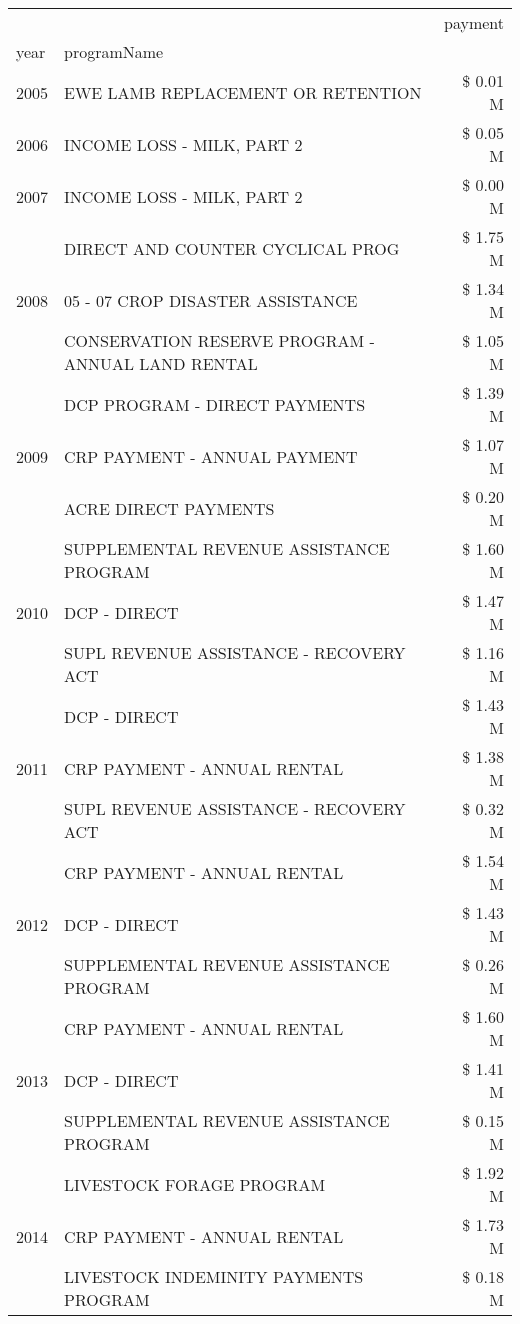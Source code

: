 \begin{tabular}{llr}
\toprule
 &  & payment \\
year & programName &  \\
\midrule
2005 & EWE LAMB REPLACEMENT OR RETENTION & \$ 0.01 M \\
\cline{1-3}
2006 & INCOME LOSS - MILK, PART 2 & \$ 0.05 M \\
\cline{1-3}
2007 & INCOME LOSS - MILK, PART 2 & \$ 0.00 M \\
\cline{1-3}
\multirow[t]{3}{*}{2008} & DIRECT AND COUNTER CYCLICAL PROG & \$ 1.75 M \\
 & 05 - 07 CROP DISASTER ASSISTANCE & \$ 1.34 M \\
 & CONSERVATION RESERVE PROGRAM - ANNUAL LAND RENTAL & \$ 1.05 M \\
\cline{1-3}
\multirow[t]{3}{*}{2009} & DCP PROGRAM - DIRECT PAYMENTS & \$ 1.39 M \\
 & CRP PAYMENT - ANNUAL PAYMENT & \$ 1.07 M \\
 & ACRE DIRECT PAYMENTS & \$ 0.20 M \\
\cline{1-3}
\multirow[t]{3}{*}{2010} & SUPPLEMENTAL REVENUE ASSISTANCE PROGRAM & \$ 1.60 M \\
 & DCP - DIRECT & \$ 1.47 M \\
 & SUPL REVENUE ASSISTANCE - RECOVERY ACT & \$ 1.16 M \\
\cline{1-3}
\multirow[t]{3}{*}{2011} & DCP - DIRECT & \$ 1.43 M \\
 & CRP PAYMENT - ANNUAL RENTAL & \$ 1.38 M \\
 & SUPL REVENUE ASSISTANCE - RECOVERY ACT & \$ 0.32 M \\
\cline{1-3}
\multirow[t]{3}{*}{2012} & CRP PAYMENT - ANNUAL RENTAL & \$ 1.54 M \\
 & DCP - DIRECT & \$ 1.43 M \\
 & SUPPLEMENTAL REVENUE ASSISTANCE PROGRAM & \$ 0.26 M \\
\cline{1-3}
\multirow[t]{3}{*}{2013} & CRP PAYMENT - ANNUAL RENTAL & \$ 1.60 M \\
 & DCP - DIRECT & \$ 1.41 M \\
 & SUPPLEMENTAL REVENUE ASSISTANCE PROGRAM & \$ 0.15 M \\
\cline{1-3}
\multirow[t]{3}{*}{2014} & LIVESTOCK FORAGE PROGRAM & \$ 1.92 M \\
 & CRP PAYMENT - ANNUAL RENTAL & \$ 1.73 M \\
 & LIVESTOCK INDEMINITY PAYMENTS PROGRAM & \$ 0.18 M \\
\cline{1-3}

\end{tabular}
